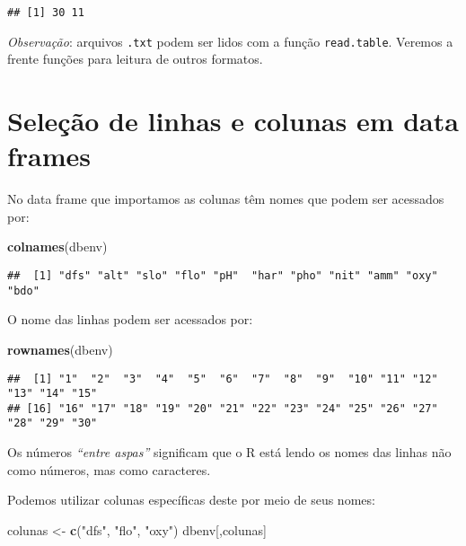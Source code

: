 \documentclass[
]{book}
\newenvironment{Shaded}{\begin{snugshade}}{\end{snugshade}}
\newcommand{\KeywordTok}[1]{\textcolor[rgb]{0.13,0.29,0.53}{\textbf{#1}}}
\newcommand{\NormalTok}[1]{#1}
\newcommand{\StringTok}[1]{\textcolor[rgb]{0.31,0.60,0.02}{#1}}
\begin{document}
\begin{verbatim}
## [1] 30 11
\end{verbatim}

\emph{Observação}: arquivos \texttt{.txt} podem ser lidos com a função \texttt{read.table}. Veremos a frente funções para leitura de outros formatos.

\hypertarget{seleuxe7uxe3o-de-linhas-e-colunas-em-data-frames}{%
\section{Seleção de linhas e colunas em data frames}\label{seleuxe7uxe3o-de-linhas-e-colunas-em-data-frames}}

No data frame que importamos as colunas têm nomes que podem ser acessados por:

\begin{Shaded}
\begin{Highlighting}[]
\KeywordTok{colnames}\NormalTok{(dbenv)}
\end{Highlighting}
\end{Shaded}

\begin{verbatim}
##  [1] "dfs" "alt" "slo" "flo" "pH"  "har" "pho" "nit" "amm" "oxy" "bdo"
\end{verbatim}

O nome das linhas podem ser acessados por:

\begin{Shaded}
\begin{Highlighting}[]
\KeywordTok{rownames}\NormalTok{(dbenv)}
\end{Highlighting}
\end{Shaded}

\begin{verbatim}
##  [1] "1"  "2"  "3"  "4"  "5"  "6"  "7"  "8"  "9"  "10" "11" "12" "13" "14" "15"
## [16] "16" "17" "18" "19" "20" "21" "22" "23" "24" "25" "26" "27" "28" "29" "30"
\end{verbatim}

Os números \emph{``entre aspas''} significam que o R está lendo os nomes das linhas não como números, mas como caracteres.

Podemos utilizar colunas específicas deste por meio de seus nomes:

\begin{Shaded}
\begin{Highlighting}[]
\NormalTok{colunas <-}\StringTok{ }\KeywordTok{c}\NormalTok{(}\StringTok{"dfs"}\NormalTok{, }\StringTok{"flo"}\NormalTok{, }\StringTok{"oxy"}\NormalTok{)}
\NormalTok{dbenv[,colunas]}
\end{Highlighting}
\end{Shaded}
\end{document}

